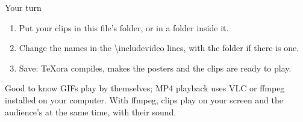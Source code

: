 \documentclass[aspectratio=169]{beamer}
\newcommand{\code}[1]{{\small\ttfamily #1}}
\begin{document}
\begin{frame}{Your turn}
  \begin{enumerate}
    \item Put your clips in this file's folder, or in a folder inside it.
    \item Change the names in the \code{\textbackslash includevideo} lines, with the folder if there is one.
    \item Save: TeXora compiles, makes the posters and the clips are ready to play.
  \end{enumerate}
  \par\bigskip
  \begin{block}{Good to know}
    GIFs play by themselves; MP4 playback uses VLC or ffmpeg installed on your computer. With ffmpeg,
    clips play on your screen and the audience's at the same time, with their sound.
  \end{block}
\end{frame}
\end{document}
